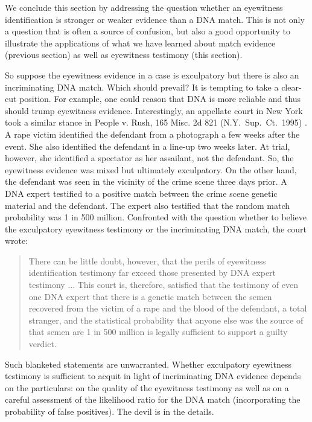 \documentclass[
  10pt,
  dvipsnames,enabledeprecatedfontcommands]{scrartcl}
\begin{document}
We conclude this section by addressing the question whether an
eyewitness identification is stronger or weaker evidence than a DNA
match. This is not only a question that is often a source of confusion,
but also a good opportunity to illustrate the applications of what we
have learned about match evidence (previous section) as well as
eyewitness testimony (this section).

So suppose the eyewitness evidence in a case is exculpatory but there is
also an incriminating DNA match. Which should prevail? It is tempting to
take a clear-cut position. For example, one could reason that DNA is
more reliable and thus should trump eyewitness evidence. Interestingly,
an appellate court in New York took a similar stance in People v. Rush,
165 Misc. 2d 821 (N.Y.~Sup.~Ct.~1995) . A rape victim identified the
defendant from a photograph a few weeks after the event. She also
identified the defendant in a line-up two weeks later. At trial,
however, she identified a spectator as her assailant, not the defendant.
So, the eyewitness evidence was mixed but ultimately exculpatory. On the
other hand, the defendant was seen in the vicinity of the crime scene
three days prior. A DNA expert testified to a positive match between the
crime scene genetic material and the defendant. The expert also
testified that the random match probability was 1 in 500 million.
Confronted with the question whether to believe the exculpatory
eyewitness testimony or the incriminating DNA match, the court wrote:

\begin{quote}
There can be little doubt, however, that the perils of eyewitness identification testimony far exceed those presented by DNA expert testimony ... This court is, therefore, satisfied that the testimony of even one DNA expert that there is a genetic match between the semen recovered from the victim of a rape and the blood of the defendant, a total stranger, and the statistical probability that anyone else was the source of that semen are 1 in 500 million is legally sufficient to support a guilty verdict.
\end{quote}

\noindent Such blanketed statements are unwarranted. Whether exculpatory
eyewitness testimony is sufficient to acquit in light of incriminating
DNA evidence depends on the particulars: on the quality of the
eyewitness testimony as well as on a careful assessment of the
likelihood ratio for the DNA match (incorporating the probability of
false positives). The devil is in the details.
\end{document}
